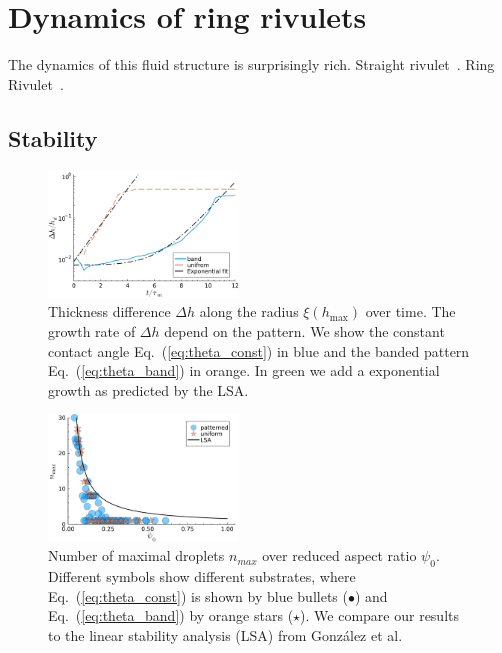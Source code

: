 \documentclass[twoside,twocolumn,9pt]{article}
\begin{document}
\section{Dynamics of ring rivulets}
\label{sec:dynamics}

The dynamics of this fluid structure is surprisingly rich. 
Straight rivulet~\cite{diezBreakupFluidRivulets2009, diezInstabilityTransverseLiquid2012}.
Ring Rivulet~\cite{gonzalezStabilityLiquidRing2013, nguyenCompetitionCollapseBreakup2012}.

\subsection{Stability}

\begin{figure}
    \centering
    \includegraphics[width=0.45\textwidth]{assets/growthRate_R180_r20_th40.pdf}
    \caption{Thickness difference $\Delta h$ along the radius $\xi(h_{\max})$ over time.
    The growth rate of $\Delta h$ depend on the pattern. 
    We show the constant contact angle Eq.~(\ref{eq:theta_const}) in blue and the banded pattern Eq.~(\ref{eq:theta_band}) in orange.
    In green we add a exponential growth as predicted by the LSA.}
    \label{fig:enter-label}
\end{figure}


\begin{figure}
    \centering
    \includegraphics[width=0.45\textwidth]{assets/LSA_droplets.pdf}
    \caption{Number of maximal droplets $n_{max}$ over reduced aspect ratio $\psi_0$.
    Different symbols show different substrates, where Eq.~(\ref{eq:theta_const}) is shown by blue bullets (\textcolor{jlblue}{$\bullet$}) and Eq.~(\ref{eq:theta_band}) by orange stars (\textcolor{jlorange}{$\star$}).
    We compare our results to the linear stability analysis (LSA) from Gonz{\'a}lez et al.~\cite{gonzalezStabilityLiquidRing2013}}
    \label{fig:max_drops}
\end{figure}
\end{document}
